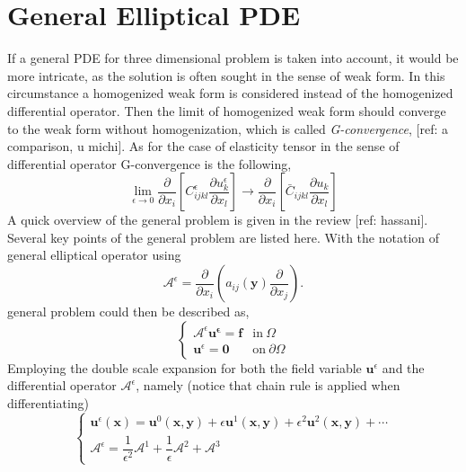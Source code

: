 \documentclass[10pt,a4paper]{scrreprt}
\begin{document}
\section{General Elliptical PDE}
If a general PDE for three dimensional problem is taken into account, it would be more intricate, as the solution is often sought in the sense of weak form. In this circumstance a homogenized weak form is considered instead of the homogenized differential operator. Then the limit of homogenized weak form should converge to the weak form without homogenization, which is called \textit{G-convergence}, [ref: a comparison, u michi]. As for the case of elasticity tensor in the sense of differential operator G-convergence is the following,
\begin{equation}
\label{eq: G conv}
\lim_{\epsilon \to 0} \dfrac{\partial}{\partial x_{i}} \left[ C^{\epsilon}_{ijkl} \dfrac{\partial u^{\epsilon}_{k}}{\partial x_{l}} \right] \rightarrow \dfrac{\partial}{\partial x_{i}} \left[ \bar{C}_{ijkl} \dfrac{\partial u_{k}}{\partial x_{l}} \right]
\end{equation}
A quick overview of the general problem is given in the review [ref: hassani]. Several key points of the general problem are listed here. With the notation of general elliptical operator using 
\begin{equation}
\mathcal{A}^{\epsilon} = \dfrac{\partial}{\partial x_{i}} \left( a_{ij}(\mathbf{y}) \dfrac{\partial}{\partial x_{j}} \right).
\end{equation}
general problem could then be described as,
\begin{equation}
\left\{
\begin{array}{ll}
\mathcal{A}^{\epsilon} \mathbf{u^{\epsilon}}= \mathbf{f} & \text{in} \ \Omega \\
\mathbf{u}^{\epsilon} = \mathbf{0} & \text{on} \ \partial \Omega
\end{array}
\right.
\end{equation}
Employing the double scale expansion for both the field variable $\mathbf{u}^{\epsilon}$ and the differential operator $\mathcal{A}^{\epsilon}$, namely (notice that chain rule is applied when differentiating)
\begin{equation}
\left\{
\begin{array}{l}
\mathbf{u}^{\epsilon}(\mathbf{x}) = \mathbf{u}^{0}(\mathbf{x},\mathbf{y}) + \epsilon \mathbf{u}^{1}(\mathbf{x},\mathbf{y}) + \epsilon^{2} \mathbf{u}^{2}(\mathbf{x},\mathbf{y}) + \cdots \\
\mathcal{A}^{\epsilon} = \dfrac{1}{\epsilon^{2}} \mathcal{A}^{1} + \dfrac{1}{\epsilon} \mathcal{A}^{2} + \mathcal{A}^{3}
\end{array}
\right.
\end{equation}
\end{document}
